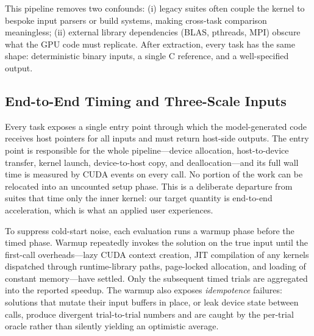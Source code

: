 \documentclass{article}
\begin{document}
This pipeline removes two confounds: (i) legacy suites often couple the
kernel to bespoke input parsers or build systems, making cross-task
comparison meaningless; (ii) external library dependencies (BLAS,
pthreads, MPI) obscure what the GPU code must replicate. After extraction,
every task has the same shape: deterministic binary inputs, a single C
reference, and a well-specified output.

\subsection{End-to-End Timing and Three-Scale Inputs}
\label{sec:interface}

Every task exposes a single entry point through which the model-generated
code receives host pointers for all inputs and must return host-side
outputs. The entry point is responsible for the whole pipeline---device
allocation, host-to-device transfer, kernel launch, device-to-host copy,
and deallocation---and its full wall time is measured by CUDA events on
every call. No portion of the work can be relocated into an uncounted
setup phase. This is a deliberate departure from suites that time only
the inner kernel: our target quantity is end-to-end acceleration, which
is what an applied user experiences.

To suppress cold-start noise, each evaluation runs a warmup phase
before the timed phase. Warmup repeatedly invokes the solution on the
true input until the first-call overheads---lazy CUDA context creation,
JIT compilation of any kernels dispatched through runtime-library
paths, page-locked allocation, and loading of constant memory---have
settled. Only the subsequent timed trials are aggregated into the
reported speedup. The warmup also exposes \emph{idempotence} failures:
solutions that mutate their input buffers in place, or leak device
state between calls, produce divergent trial-to-trial numbers and are
caught by the per-trial oracle rather than silently yielding an
optimistic average.
\end{document}
